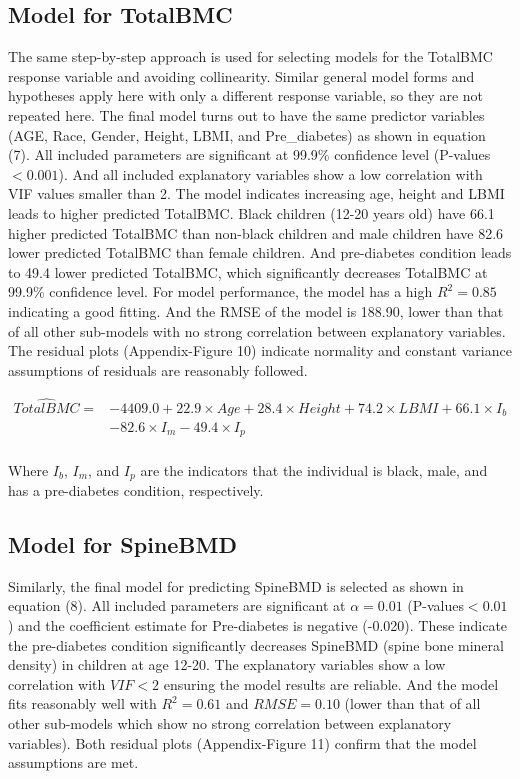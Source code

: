 \documentclass[11pt]{article}
\begin{document}
\subsection{Model for TotalBMC}
The same step-by-step approach is used for selecting models for the TotalBMC response variable and avoiding collinearity. Similar general model forms and hypotheses apply here with only a different response variable, so they are not repeated here. The final model turns out to have the same predictor variables (AGE, Race, Gender, Height, LBMI, and Pre\_diabetes) as shown in equation (7). All included parameters are significant at 99.9\% confidence level (P-values$<0.001$). And all included explanatory variables show a low correlation with VIF values smaller than 2. The model indicates increasing age, height and LBMI leads to higher predicted TotalBMC. Black children (12-20 years old) have 66.1 higher predicted TotalBMC than non-black children and male children have 82.6 lower predicted TotalBMC than female children. And pre-diabetes condition leads to 49.4 lower predicted TotalBMC, which significantly decreases TotalBMC at 99.9\% confidence level. For model performance, the model has a high $R^2=0.85$ indicating a good fitting. And the RMSE of the model is 188.90, lower than that of all other sub-models with no strong correlation between explanatory variables. The residual plots (Appendix-Figure 10) indicate normality and constant variance assumptions of residuals are reasonably followed.  

\begin{equation}
\begin{split}
\hat{TotalBMC} = &-4409.0 +22.9\times Age +28.4\times Height +74.2\times LBMI + 66.1\times I_b \\
& -82.6\times I_m -49.4\times I_p \\
\end{split}
\end{equation}

Where $I_b$, $I_m$, and $I_p$ are the indicators that the individual is black, male, and has a pre-diabetes condition, respectively.


\subsection{Model for SpineBMD}
Similarly, the final model for predicting SpineBMD is selected as shown in equation (8). All included parameters are significant at $\alpha=0.01$ (P-values$<0.01$) and the coefficient estimate for Pre-diabetes is negative (-0.020). These indicate the pre-diabetes condition significantly decreases SpineBMD (spine bone mineral density) in children at age 12-20. The explanatory variables show a low correlation with $VIF<2$ ensuring the model results are reliable. And the model fits reasonably well with $R^2= 0.61$ and $RMSE=0.10$ (lower than that of all other sub-models which show no strong correlation between explanatory variables). Both residual plots (Appendix-Figure 11) confirm that the model assumptions are met.
\end{document}

